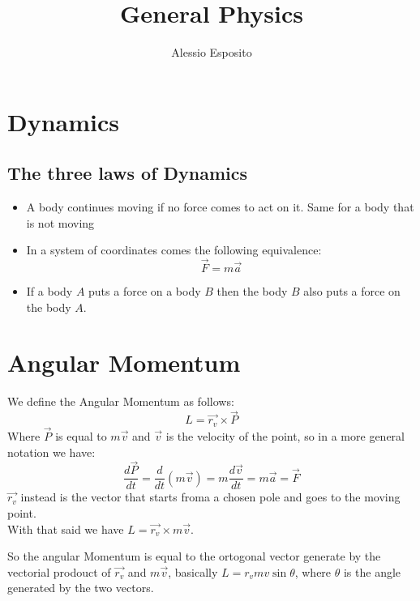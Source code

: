\documentclass{article}
\title{General Physics}
\author{Alessio Esposito}
\begin{document}
    \maketitle
    \section{Dynamics}
        \subsection{The three laws of Dynamics}
            \begin{itemize}
                \item A body continues moving if no force comes to act on it. Same for a body that is not moving
                \item In a system of coordinates comes the following equivalence: 
                    \begin{equation*}
                        \vec{F} = m \vec{a}             
                    \end{equation*}
                \item If a body $A$ puts a force on a body $B$ then the body $B$ also puts a force on the body $A$.
            \end{itemize}
            \section{Angular Momentum}
                We define the Angular Momentum as follows:
                \begin{equation*}
                    L = \vec{r_v} \times \vec{P}
                \end{equation*}
                Where $\vec{P}$ is equal to $m\vec{v}$ and $\vec{v}$ is the velocity of the point, so in a more general notation we have:
                \begin{equation*}
                    \frac{d\vec{P}}{dt} = \frac{d}{dt}(m\vec{v}) = m \frac{d\vec{v}}{dt} = m \vec{a} = \vec{F} 
                \end{equation*}
                $\vec{r_v}$ instead is the vector that starts froma a chosen pole and goes to the moving point. \\ 
                With that said we have $L = \vec{r_v} \times m\vec{v}$.
                
                So the angular Momentum is equal to the ortogonal vector generate by the vectorial prodouct of $\vec{r_v}$ and $m\vec{v}$, basically $L = r_v mv \sin{\theta}$, where $\theta$ is the angle generated by the two vectors.
\end{document}

